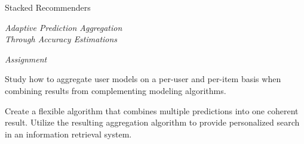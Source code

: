 \begin{narrow}

\null\vspace{6em}

{
  \centering
  \LARGE{Stacked Recommenders}\\
  \vspace{1em}
  
  \itshape
  \color{red}
  \large{Adaptive Prediction Aggregation}\\
  \large{Through Accuracy Estimations}\\
}

\vspace{5em}

{
  \centering
  \itshape
  Assignment\\
}
\vspace{1em}

Study how to aggregate user models on a per-user and per-item
basis when combining results from complementing modeling algorithms.

Create a flexible algorithm that combines multiple predictions
into one coherent result.
Utilize the resulting aggregation algorithm
to provide personalized search in an information retrieval system.

\end{narrow}
\vfill
\clearpage

